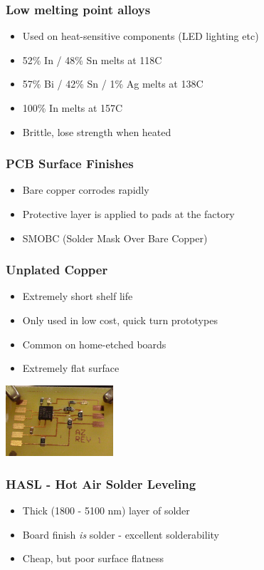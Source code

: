 \documentclass{beamer}
\begin{document}
\begin{frame}
\frametitle{Low melting point alloys}
\begin{itemize}
\item Used on heat-sensitive components (LED lighting etc)
\item 52\% In / 48\% Sn melts at 118C
\item 57\% Bi / 42\% Sn / 1\% Ag melts at 138C
\item 100\% In melts at 157C
\item Brittle, lose strength when heated
\end{itemize}
\end{frame}

\begin{frame}
\frametitle{PCB Surface Finishes}
\begin{itemize}
\item Bare copper corrodes rapidly
\item Protective layer is applied to pads at the factory
\item SMOBC (Solder Mask Over Bare Copper)
\end{itemize}
\end{frame}

\begin{frame}
\frametitle{Unplated Copper}
\begin{itemize}
\item Extremely short shelf life
\item Only used in low cost, quick turn prototypes
\item Common on home-etched boards
\item Extremely flat surface
\end{itemize}
\begin{center}
\includegraphics[width=4cm,keepaspectratio]{no-plating.jpg}
\end{center}
\end{frame}

\begin{frame}
\frametitle{HASL - Hot Air Solder Leveling}
\begin{itemize}
\item Thick (1800 - 5100 nm) layer of solder
\item Board finish \emph{is} solder - excellent solderability
\item Cheap, but poor surface flatness
\end{itemize}
\end{frame}
\end{document}
